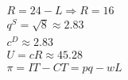 \begin{itemize}
\begin{multicols}{2}
					\begin{gather*}
						R = 24 - L \Longrightarrow R = 16 \\
						q^S = \sqrt{8} \approx 2.83\\
						c^D \approx 2.83 \\
						U = cR \approx 45.28\\
						\pi = IT - CT = pq - wL
					\end{gather*}
				\end{multicols}
			\vspace{-0.8cm}
\end{itemize}